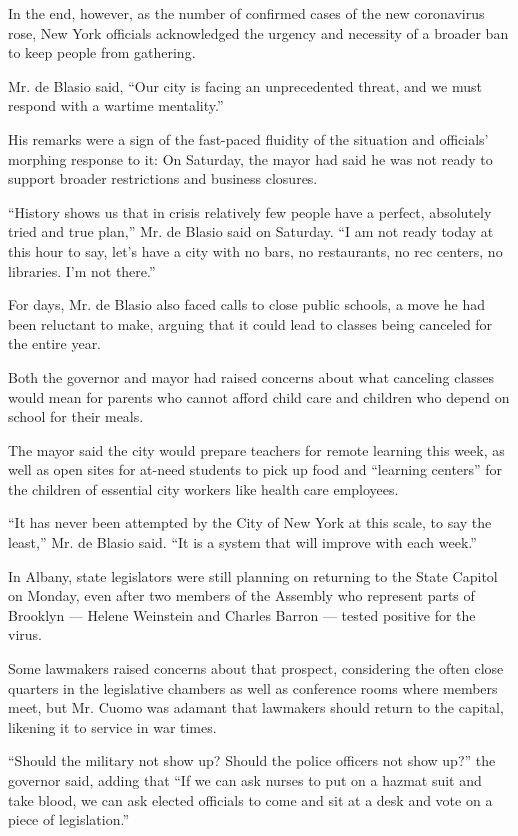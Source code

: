 In the end, however, as the number of confirmed cases of the new
coronavirus rose, New York officials acknowledged the urgency and
necessity of a broader ban to keep people from gathering.

Mr. de Blasio said, ``Our city is facing an unprecedented threat, and we
must respond with a wartime mentality.''

His remarks were a sign of the fast-paced fluidity of the situation and
officials' morphing response to it: On Saturday, the mayor had said he
was not ready to support broader restrictions and business closures.

``History shows us that in crisis relatively few people have a perfect,
absolutely tried and true plan,'' Mr. de Blasio said on Saturday. ``I am
not ready today at this hour to say, let's have a city with no bars, no
restaurants, no rec centers, no libraries. I'm not there.''

For days, Mr. de Blasio also faced calls to close public schools, a move
he had been reluctant to make, arguing that it could lead to classes
being canceled for the entire year.

Both the governor and mayor had raised concerns about what canceling
classes would mean for parents who cannot afford child care and children
who depend on school for their meals.

The mayor said the city would prepare teachers for remote learning this
week, as well as open sites for at-need students to pick up food and
``learning centers'' for the children of essential city workers like
health care employees.

``It has never been attempted by the City of New York at this scale, to
say the least,'' Mr. de Blasio said. ``It is a system that will improve
with each week.''

In Albany, state legislators were still planning on returning to the
State Capitol on Monday, even after two members of the Assembly who
represent parts of Brooklyn --- Helene Weinstein and Charles Barron ---
tested positive for the virus.

Some lawmakers raised concerns about that prospect, considering the
often close quarters in the legislative chambers as well as conference
rooms where members meet, but Mr. Cuomo was adamant that lawmakers
should return to the capital, likening it to service in war times.

``Should the military not show up? Should the police officers not show
up?'' the governor said, adding that ``If we can ask nurses to put on a
hazmat suit and take blood, we can ask elected officials to come and sit
at a desk and vote on a piece of legislation.''

